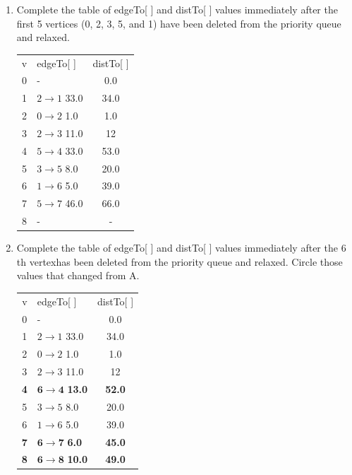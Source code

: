 \documentclass{article}
\begin{document}
\begin{enumerate}
\renewcommand{\theenumi}{\Alph{enumi}}
	\item Complete the table of edgeTo[ ] and distTo[ ] values immediately after the first 5 vertices (0, 2, 3, 5, and 1) have been deleted from the priority queue and relaxed.\\

	\begin{tabular}{c l c}
	v & edgeTo[ ] & distTo[ ]\\
	0 & \hspace{2mm}- & 0.0\\
	1 & $2 \rightarrow 1$ 33.0 & 34.0\\
	2 & $0 \rightarrow 2$ 1.0 & 1.0\\
	3 & $2 \rightarrow 3$ 11.0 & 12\\
	4 & $5 \rightarrow 4$ 33.0 & 53.0\\
	5 & $3 \rightarrow 5$ 8.0 & 20.0\\
	6 & $1 \rightarrow 6$ 5.0 & 39.0\\
	7 & $5 \rightarrow 7$ 46.0 & 66.0\\
	8 & \hspace{2mm}- & -
	\end{tabular}

	\item Complete the table of edgeTo[ ] and distTo[ ] values immediately after the 6 th vertexhas been deleted from the priority queue and relaxed. Circle those values that changed from A.\\

	\begin{tabular}{c l c}
	v & edgeTo[ ] & distTo[ ]\\
	0 & \hspace{2mm}- & 0.0\\
	1 & $2 \rightarrow 1$ 33.0 & 34.0\\
	2 & $0 \rightarrow 2$ 1.0 & 1.0\\
	3 & $2 \rightarrow 3$ 11.0 & 12\\
	\textbf{4} & $\mathbf{6 \rightarrow 4}$ \textbf{13.0} & \textbf{52.0}\\
	5 & $3 \rightarrow 5$ 8.0 & 20.0\\
	6 & $1 \rightarrow 6$ 5.0 & 39.0\\
	\textbf{7} & $\mathbf{6 \rightarrow 7}$ \textbf{6.0} & \textbf{45.0}\\
	\textbf{8} & $\mathbf{6 \rightarrow 8}$ \textbf{10.0} & \textbf{49.0}
	\end{tabular}

\end{enumerate}
\end{document}
